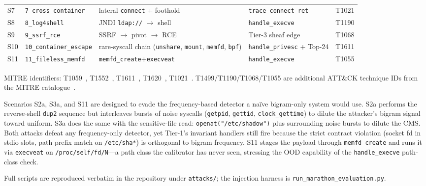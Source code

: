 \begin{table}[h]
\begin{tabular}{@{}l l p{4.8cm} l l@{}}
S7   & \texttt{7\_cross\_container} & lateral \texttt{connect} + foothold         & \texttt{trace\_connect\_ret}  & T1021 \\
S8   & \texttt{8\_log4shell}        & JNDI \texttt{ldap://} $\to$ shell           & \texttt{handle\_execve}       & T1190 \\
S9   & \texttt{9\_ssrf\_rce}        & SSRF $\to$ pivot $\to$ RCE                  & Tier-3 sheaf edge             & T1068 \\
S10  & \texttt{10\_container\_escape} & rare-syscall chain (\texttt{unshare}, \texttt{mount},
                                          \texttt{memfd}, \texttt{bpf})
                                                                                & \texttt{handle\_privesc} + Top-24 & T1611 \\
S11  & \texttt{11\_fileless\_memfd} & \texttt{memfd\_create}+\texttt{execveat}    & \texttt{handle\_execve}       & T1055 \\
\bottomrule
\end{tabular}
\end{table}

MITRE identifiers: T1059~\cite{mitre_t1059}, T1552~\cite{mitre_t1552},
T1611~\cite{mitre_t1611}, T1620~\cite{mitre_t1620},
T1021~\cite{mitre_t1021}. T1499/T1190/T1068/T1055 are additional ATT\&CK
technique IDs from the MITRE catalogue~\cite{mitre2024attack}.

Scenarios S2a, S3a, and S11 are designed to evade the frequency-based
detector a na\"ive bigram-only system would use. S2a performs the
reverse-shell \texttt{dup2} sequence but interleaves bursts of noise
syscalls (\texttt{getpid}, \texttt{gettid}, \texttt{clock\_gettime}) to
dilute the attacker's bigram signal toward uniform. S3a does the same
with the sensitive-file read: \texttt{openat("/etc/shadow")} plus
surrounding noise bursts to dilute the CMS. Both attacks defeat any
frequency-only detector, yet Tier-1's invariant handlers still fire
because the strict contract violation (socket fd in stdio slots,
path prefix match on \texttt{/etc/sha*}) is orthogonal to bigram
frequency. S11 stages the payload through \texttt{memfd\_create} and
runs it via \texttt{execveat} on \texttt{/proc/self/fd/N}---a path
class the calibrator has never seen, stressing the OOD capability of
the \texttt{handle\_execve} path-class check.

Full scripts are reproduced verbatim in the repository under
\texttt{attacks/}; the injection harness is
\texttt{run\_marathon\_evaluation.py}.
